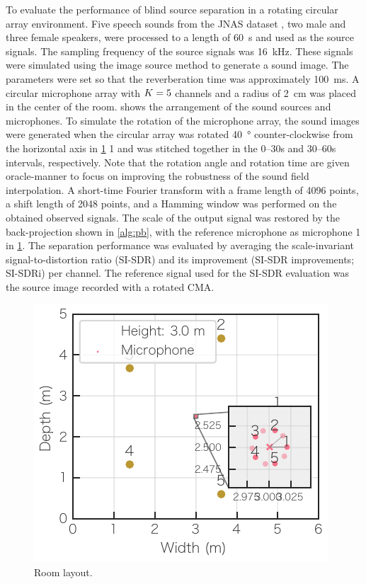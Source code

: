 \documentclass[sip,biber]{now-journal}
\begin{document}
To evaluate the performance of blind source separation in a rotating circular array environment.
Five speech sounds from the JNAS dataset \cite{Itou:1999:AST}, two male and three female speakers, were processed to a length of \SI{60}{\second} and used as the source signals.
The sampling frequency of the source signals was \SI{16}{\kilo\hertz}.
These signals were simulated using the image source method \cite{Allen:1979:JASA} to generate a sound image.
The parameters were set so that the reverberation time was approximately \SI{100}{\milli\second}.
A circular microphone array with $K = 5$ channels and a radius of \SI{2}{\centi\metre} was placed in the center of the room.
 shows the arrangement of the sound sources and microphones.
To simulate the rotation of the microphone array, the sound images were generated when the circular array was rotated \SI{40}{\degree} counter-clockwise from the horizontal axis in \cref{fig:layout} 1 and was stitched together in the 0--30\si{\second} and 30--60\si{\second} intervals, respectively.
Note that the rotation angle and rotation time are given oracle-manner to focus on improving the robustness of the sound field interpolation.
A short-time Fourier transform with a frame length of 4096 points, a shift length of 2048 points, and a Hamming window was performed on the obtained observed signals.
The scale of the output signal was restored by the back-projection shown in \cref{alg:pb}, with the reference microphone as microphone 1 in \cref{fig:layout}.
The separation performance was evaluated by averaging the scale-invariant signal-to-distortion ratio (SI-SDR) \cite{LeRoux:2019:ICASSP} and its improvement (SI-SDR improvements; SI-SDRi) per channel.
The reference signal used for the SI-SDR evaluation was the source image recorded with a rotated CMA.
\begin{figure}[t]
  \centering
  \includegraphics{figures/room_layout.pdf}
  \caption{Room layout.}%
  \label{fig:layout}
\end{figure}
\end{document}
